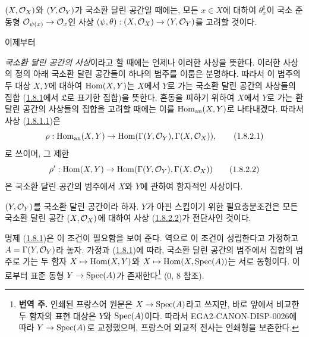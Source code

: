 \begin{env}[1.8.2]
\label{ega2:addendum:I.1.8.2-ko}
$(X,\mathcal{O}_X)$와 $(Y,\mathcal{O}_Y)$가 국소환 달린 공간일 때에는, 모든
$x\in X$에 대하여 $\theta_x^\sharp$이 국소 준동형
$\mathcal{O}_{\psi(x)}\to\mathcal{O}_x$인 사상
$(\psi,\theta):(X,\mathcal{O}_X)\to(Y,\mathcal{O}_Y)$를 고려할 것이다.

이제부터
\emph{국소환 달린 공간의 사상}이라고 할 때에는 언제나 이러한 사상을
뜻한다. 이러한 사상의 정의 아래 국소환 달린 공간들이 하나의 범주를
이룸은 분명하다. 따라서 이 범주의 두 대상 $X,Y$에 대하여 $\operatorname{Hom}(X,Y)$는
$X$에서 $Y$로 가는 국소환 달린 공간의 사상들의 집합
(\hyperref[ega2:addendum:I.1.8.1-ko]{1.8.1}에서 $\mathfrak L$로 표기한
집합)을 뜻한다. 혼동을 피하기 위하여 $X$에서 $Y$로 가는 환 달린 공간의
사상들의 집합을 고려할 때에는 이를 $\operatorname{Hom}_{\mathrm{an}}(X,Y)$로
나타내겠다. 따라서 사상 (\hyperref[ega2:addendum:I.1.8.1.1-ko]{1.8.1.1})은
\begin{equation}
\label{ega2:addendum:I.1.8.2.1-ko}
  \rho:\operatorname{Hom}_{\mathrm{an}}(X,Y)
  \to\operatorname{Hom}(\Gamma(Y,\mathcal{O}_Y),\Gamma(X,\mathcal{O}_X)),
\tag{1.8.2.1}
\end{equation}
로 쓰이며, 그 제한
\begin{equation}
\label{ega2:addendum:I.1.8.2.2-ko}
  \rho':\operatorname{Hom}(X,Y)
  \to\operatorname{Hom}(\Gamma(Y,\mathcal{O}_Y),\Gamma(X,\mathcal{O}_X))
\tag{1.8.2.2}
\end{equation}
은 국소환 달린 공간의 범주에서 $X$와 $Y$에 관하여 함자적인 사상이다.
\end{env}
\begin{corollary}[1.8.3]
\label{ega2:addendum:I.1.8.3-ko}
$(Y,\mathcal{O}_Y)$를 국소환 달린 공간이라 하자. $Y$가 아핀 스킴이기 위한
필요충분조건은 모든 국소환 달린 공간 $(X,\mathcal{O}_X)$에 대하여 사상
(\hyperref[ega2:addendum:I.1.8.2.2-ko]{1.8.2.2})가 전단사인 것이다.
\end{corollary}

명제 (\hyperref[ega2:addendum:I.1.8.1-ko]{1.8.1})은 이 조건이 필요함을
보여 준다. 역으로 이 조건이 성립한다고 가정하고
$A=\Gamma(Y,\mathcal{O}_Y)$라 놓자. 가정과
(\hyperref[ega2:addendum:I.1.8.1-ko]{1.8.1})에 따라, 국소환 달린 공간의
범주에서 집합의 범주로 가는 두 함자 $X\mapsto\operatorname{Hom}(X,Y)$와
$X\mapsto\operatorname{Hom}(X,\operatorname{Spec}(A))$는 서로 동형이다. 이로부터 표준 동형
$Y\to\operatorname{Spec}(A)$가 존재한다\footnote{\textbf{번역 주.} 인쇄된 프랑스어
원문은 $X\to\operatorname{Spec}(A)$라고 쓰지만, 바로 앞에서 비교한 두 함자의 표현
대상은 $Y$와 $\operatorname{Spec}(A)$이다. 따라서 EGA2-CANON-DISP-0026에 따라
$Y\to\operatorname{Spec}(A)$로 교정했으며, 프랑스어 외교적 전사는 인쇄형을
보존한다.} (0, 8 참조).

